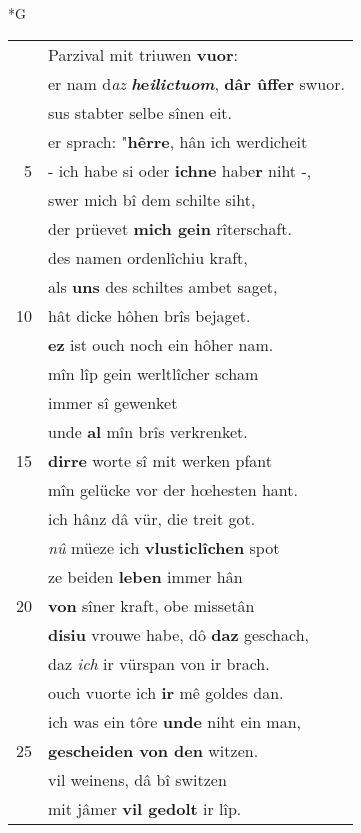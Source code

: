 \documentclass[8pt,a4paper,notitlepage]{article}
\begin{document}
\begin{table}[ht]
\begin{minipage}[t]{0.5\linewidth}
\small
\begin{center}*G
\end{center}
\begin{tabular}{rl}
 & Parzival mit triuwen \textbf{vuor}:\\ 
 & er nam d\textit{az} \textbf{\textit{h}e\textit{ilictuom}}, \textbf{dâr ûffer} swuor.\\ 
 & sus stabter selbe sînen eit.\\ 
 & er sprach: "\textbf{hêrre}, hân ich werdicheit\\ 
5 & - ich habe si oder \textbf{ich}\textbf{ne} habe\textbf{r} niht -,\\ 
 & swer mich bî dem schilte siht,\\ 
 & der prüevet \textbf{mich gein} rîterschaft.\\ 
 & des namen ordenlîchiu kraft,\\ 
 & als \textbf{uns} des schiltes ambet saget,\\ 
10 & hât dicke hôhen brîs bejaget.\\ 
 & \textbf{ez} ist ouch noch ein hôher nam.\\ 
 & mîn lîp gein werltlîcher scham\\ 
 & immer sî gewenket\\ 
 & unde \textbf{al} mîn brîs verkrenket.\\ 
15 & \textbf{dirre} worte sî mit werken pfant\\ 
 & mîn gelücke vor der hœhesten hant.\\ 
 & ich hânz dâ vür, die treit got.\\ 
 & \textit{nû} müeze ich \textbf{vlusticlîchen} spot\\ 
 & ze beiden \textbf{leben} immer hân\\ 
20 & \textbf{von} sîner kraft, obe missetân\\ 
 & \textbf{disiu} vrouwe habe, dô \textbf{daz} geschach,\\ 
 & daz \textit{ich} ir vürspan von ir brach.\\ 
 & ouch vuorte ich \textbf{ir} mê goldes dan.\\ 
 & ich was ein tôre \textbf{unde} niht ein man,\\ 
25 & \textbf{gescheiden von den} witzen.\\ 
 & vil weinens, dâ bî switzen\\ 
 & mit jâmer \textbf{vil gedolt} ir lîp.\\ 

\end{tabular}
\end{minipage}
\end{table}
\end{document}
